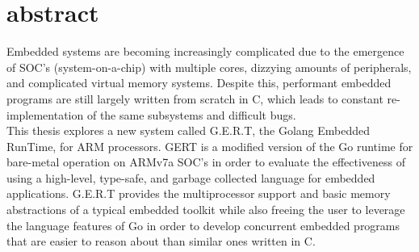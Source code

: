% 
% 
%
\section{abstract}

Embedded systems are becoming increasingly complicated due
to the emergence of SOC's (system-on-a-chip) with multiple cores, dizzying amounts of peripherals, and
complicated virtual memory systems. Despite this,
performant embedded programs are still largely written from scratch in
C, which leads to constant re-implementation of the same subsystems and difficult bugs.
\\


This thesis explores a new system called G.E.R.T, the Golang Embedded RunTime, for ARM processors.
GERT is a modified version of the Go runtime for
bare-metal operation on ARMv7a SOC's in order to evaluate
the effectiveness of using a high-level, type-safe, and garbage collected
language for embedded applications. G.E.R.T
provides the multiprocessor support and basic memory abstractions of a
typical embedded toolkit while also freeing the user to leverage the language features
of Go in order to develop
concurrent embedded programs that are easier to reason about than similar ones
written in C.

